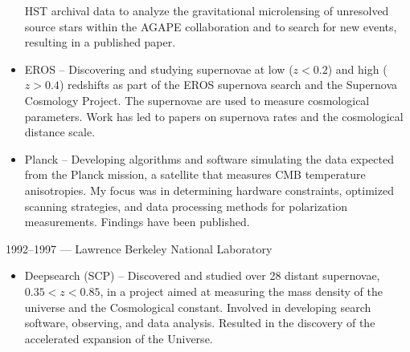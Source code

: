 \documentclass[line, margin]{res}
\begin{document}
\begin{resume}
\begin{itemize}
 HST archival data to analyze the gravitational microlensing of unresolved
source stars within the AGAPE collaboration and to search for new events,  resulting in a published paper.
\item EROS -- Discovering and studying supernovae at low ($z<0.2$) and high ($z > 0.4$)
redshifts as part of the EROS supernova search and the Supernova Cosmology
Project.  The supernovae are used to measure cosmological parameters. Work has led to papers on
supernova rates and the cosmological distance scale.
\item Planck -- Developing algorithms and software simulating the data expected from
the Planck mission, a satellite that measures CMB temperature
anisotropies.  My focus was in determining hardware constraints, optimized scanning strategies, and data processing
methods for polarization measurements. Findings have been published.
\end{itemize}
1992--1997 --- Lawrence Berkeley National Laboratory
\begin{itemize}
\item Deepsearch (SCP) -- Discovered and studied over 28 distant supernovae, $0.35< z < 0.85$, in a
 project aimed at measuring the mass density of the universe and the
 Cosmological constant.  Involved in developing search software, observing,
 and data analysis.  Resulted in the discovery of the accelerated expansion of the Universe.
\end{itemize}


\end{resume}
\end{document}

